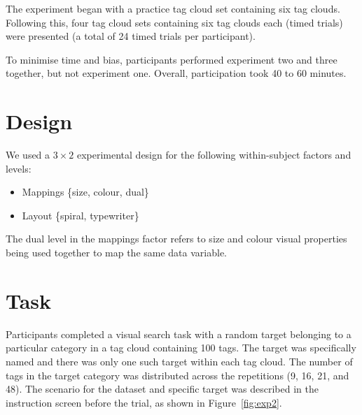The experiment began with a practice tag cloud set containing six tag clouds. Following this, four tag cloud sets containing six tag clouds each (timed trials) were presented (a total of 24 timed trials per participant).

To minimise time and bias, participants performed experiment two and three together, but not experiment one. Overall, participation took 40 to 60 minutes.

\section{Design}
We used a $3\times2$ experimental design for the following within-subject factors and levels:

\begin{itemize}
	\item Mappings \{size, colour, dual\}
	\item Layout \{spiral, typewriter\}
\end{itemize}

The dual level in the mappings factor refers to size and colour visual properties being used together to map the same data variable.

\section{Task}
 
Participants completed a visual search task with a random target belonging to a particular category in a tag cloud containing 100 tags. The target was specifically named and there was only one such target within each tag cloud. The number of tags in the target category was distributed across the repetitions (9, 16, 21, and 48). The scenario for the dataset and specific target was described in the instruction screen before the trial, as shown in Figure~\vref{fig:exp2}. 

